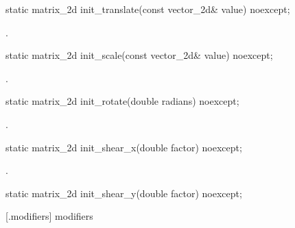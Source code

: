 \begin{itemdecl}
static matrix_2d init_translate(const vector_2d& value) noexcept;
\end{itemdecl}
\begin{itemdescr}
	\pnum
	\returns
	.
\end{itemdescr}

\begin{itemdecl}
static matrix_2d init_scale(const vector_2d& value) noexcept;
\end{itemdecl}
\begin{itemdescr}
	\pnum
	\returns
	.
\end{itemdescr}

\begin{itemdecl}
static matrix_2d init_rotate(double radians) noexcept;
\end{itemdecl}
\begin{itemdescr}
	\pnum
	\returns
	.
\end{itemdescr}

\begin{itemdecl}
static matrix_2d init_shear_x(double factor) noexcept;
\end{itemdecl}
\begin{itemdescr}
	\pnum
	\returns
	.
\end{itemdescr}

\begin{itemdecl}
static matrix_2d init_shear_y(double factor) noexcept;
\end{itemdecl}
\begin{itemdescr}
	\pnum
	\returns
\end{itemdescr}

 [\matrixtwod.modifiers] { modifiers}


